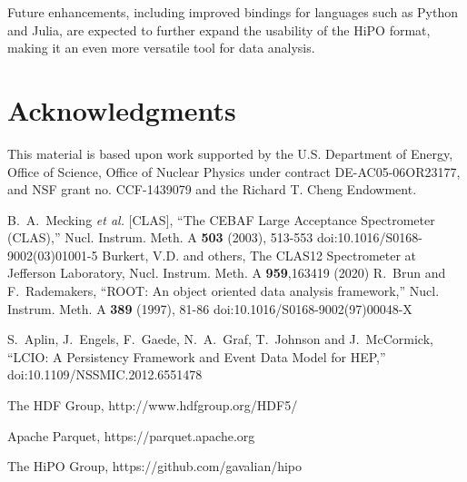 \documentclass[preprint,12pt]{elsarticle}
\begin{document}
Future enhancements, including improved bindings for languages such as Python and Julia, are expected to further expand the usability of the HiPO format, making it an even more versatile tool for data analysis.

\section{Acknowledgments}

This material is based upon work supported by the U.S. Department of Energy, Office of Science,
Office of Nuclear Physics under contract DE-AC05-06OR23177, and NSF grant no. CCF-1439079 and
the Richard T. Cheng Endowment. 
 
 
\begin{thebibliography}{}
B.~A.~Mecking \textit{et al.} [CLAS],
``The CEBAF Large Acceptance Spectrometer (CLAS),''
Nucl. Instrum. Meth. A \textbf{503} (2003), 513-553
doi:10.1016/S0168-9002(03)01001-5
Burkert, V.D. and others, The CLAS12 Spectrometer at Jefferson Laboratory, Nucl. Instrum. Meth. A \textbf{959},163419 (2020)
R.~Brun and F.~Rademakers,
``ROOT: An object oriented data analysis framework,''
Nucl. Instrum. Meth. A \textbf{389} (1997), 81-86
doi:10.1016/S0168-9002(97)00048-X

S.~Aplin, J.~Engels, F.~Gaede, N.~A.~Graf, T.~Johnson and J.~McCormick,
``LCIO: A Persistency Framework and Event Data Model for HEP,''
doi:10.1109/NSSMIC.2012.6551478

The HDF Group,  http://www.hdfgroup.org/HDF5/

Apache Parquet, https://parquet.apache.org

The HiPO Group, 
https://github.com/gavalian/hipo
\end{thebibliography}
%
%
\end{document}
